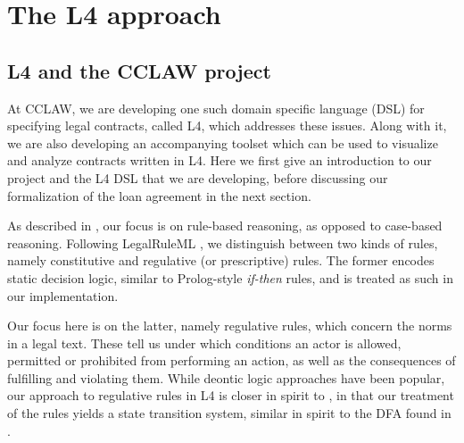 \documentclass{article}
\begin{document}

\section{The L4 approach}

\subsection{L4 and the CCLAW project}
At CCLAW, we are developing one such domain specific language (DSL) for
specifying legal contracts, called L4, which addresses these issues.
Along with it, we are also developing an accompanying toolset which can be used
to visualize and analyze contracts written in L4.
Here we first give an introduction to our project and the L4 DSL that
we are developing, before discussing our formalization of the loan agreement in
the next section.

As described in
,
our focus is on rule-based reasoning, as opposed to case-based reasoning.
Following LegalRuleML , we distinguish between two kinds
of rules, namely constitutive and regulative (or prescriptive) rules.
The former encodes static decision logic, similar to Prolog-style
\textit{if-then} rules, and is treated as such in our implementation.

Our focus here is on the latter, namely regulative rules, which concern the
norms in a legal text.
These tell us under which conditions an actor is allowed, permitted or
prohibited from performing an action, as well as the consequences of fulfilling
and violating them.
While deontic logic approaches have been popular,
our approach to regulative rules in L4 is closer in spirit to
\cite{real_time_contract_automata, normative_diags_diogo},
in that our treatment of the rules yields a state transition system,
similar in spirit to the DFA found in \cite{contract_as_automaton}.
\end{document}
